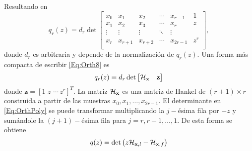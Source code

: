         	Resultando en \begin{equation} q_r(z) = d_r\det\begin{bmatrix} x_0 & x_1 & x_2 & \cdots & x_{r-1} & 1\\[0.3em] x_1 & x_2 & x_3 & \cdots & x_{r} & z\\[0.3em] \vdots & \vdots & \vdots & \ddots &\vdots\\[0.3em] x_{r} & x_{r+1} & x_{r+2} & \cdots & x_{2r-1} & z^r\\[0.3em]
        	\end{bmatrix},
        	\label{Eq:Orth8}
        	\end{equation}
        	donde $d_r$ es arbitraria y depende de la normalización de $q_r(z)$. Una forma más compacta de escribir \eqref{Eq:Orth8} es
        	\begin{equation}
        	q_r(z) = d_r\det\begin{bmatrix} \mathcal{H}_{\mathbf{x}} & \mathbf{z}\end{bmatrix}
        	\label{Eq:OrthPoly}
        	\end{equation} 
        	donde $\mathbf{z} = [1\,\, z \,\,\cdots\, z^r]^T$. La matriz $\mathcal{H}_{\mathbf{x}}$ es una matriz de Hankel de $(r+1)\times r$ construida a partir de las muestras $x_0, x_1,\ldots, x_{2r-1}$. El determinante en \eqref{Eq:OrthPoly} se puede transformar multiplicando la $j-$ésima fila por $-z$ y sumándole la $(j+1)-$ésima fila para $j=r,r-1,\ldots,1$. De esta forma se obtiene
        	\begin{equation}
        	q(z) = \det\big(z\mathcal{H}_{\mathbf{x},l}-\mathcal{H}_{\mathbf{x},f}\big)
        	\label{Eq:detPencil}
        	\end{equation}
